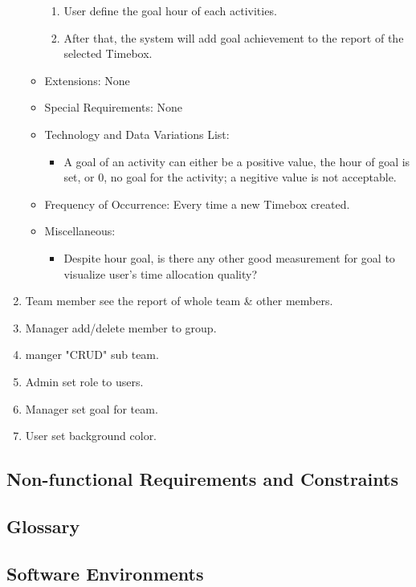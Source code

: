 \documentclass[12pt, a4paper]{article}
\begin{document}
\begin{CJK*}{UTF8}{bkai}
\begin{enumerate}
\begin{itemize}
\begin{enumerate}
              \item User define the goal hour of each activities.
              \item After that, the system will add goal achievement to the report of the selected Timebox.
            \end{enumerate}
          \item Extensions: None
          \item Special Requirements: None
          \item Technology and Data Variations List:
            \begin{itemize}
              \item A goal of an activity can either be a positive value, the hour of goal is set, or 0, no goal for the activity; a negitive value is not acceptable.
            \end{itemize}
          \item Frequency of Occurrence: Every time a new Timebox created.
          \item Miscellaneous:
            \begin{itemize}
              \item Despite hour goal, is there any other good measurement for goal to visualize user's time allocation quality?
            \end{itemize}
        \end{itemize}
      \item Team member see the report of whole team \& other members.
      \item Manager add/delete member to group.
      \item manger "CRUD" sub team.
      \item Admin set role to users.
      \item Manager set goal for team.
      \item User set background color.
    \end{enumerate}

  \subsection{Non-functional Requirements and Constraints}

  \subsection{Glossary}

  \subsection{Software Environments}


\end{CJK*}
\end{document}
